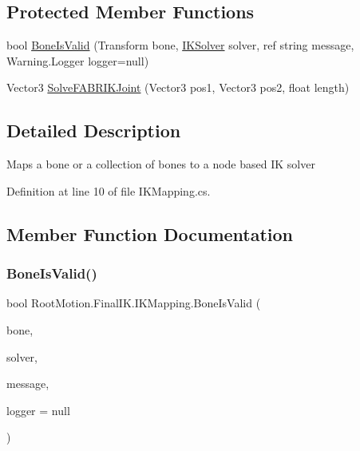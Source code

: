 \subsection*{Protected Member Functions}
\begin{DoxyCompactItemize}
\item 
bool \mbox{\hyperlink{class_root_motion_1_1_final_i_k_1_1_i_k_mapping_ae296464af6fcc3fbdb430865156b3389}{Bone\+Is\+Valid}} (Transform bone, \mbox{\hyperlink{class_root_motion_1_1_final_i_k_1_1_i_k_solver}{I\+K\+Solver}} solver, ref string message, Warning.\+Logger logger=null)
\item 
Vector3 \mbox{\hyperlink{class_root_motion_1_1_final_i_k_1_1_i_k_mapping_a8033dee3f08c43f5e9d43c7cac83043f}{Solve\+F\+A\+B\+R\+I\+K\+Joint}} (Vector3 pos1, Vector3 pos2, float length)
\end{DoxyCompactItemize}


\subsection{Detailed Description}
Maps a bone or a collection of bones to a node based IK solver 



Definition at line 10 of file I\+K\+Mapping.\+cs.



\subsection{Member Function Documentation}
\mbox{\label{class_root_motion_1_1_final_i_k_1_1_i_k_mapping_ae296464af6fcc3fbdb430865156b3389}} 
\subsubsection{\texorpdfstring{Bone\+Is\+Valid()}{BoneIsValid()}}
{\footnotesize\ttfamily bool Root\+Motion.\+Final\+I\+K.\+I\+K\+Mapping.\+Bone\+Is\+Valid (\begin{DoxyParamCaption}\item[{Transform}]{bone,  }\item[{\mbox{\hyperlink{class_root_motion_1_1_final_i_k_1_1_i_k_solver}{I\+K\+Solver}}}]{solver,  }\item[{ref string}]{message,  }\item[{Warning.\+Logger}]{logger = {\ttfamily null} }\end{DoxyParamCaption})\hspace{0.3cm}{\ttfamily [protected]}}



